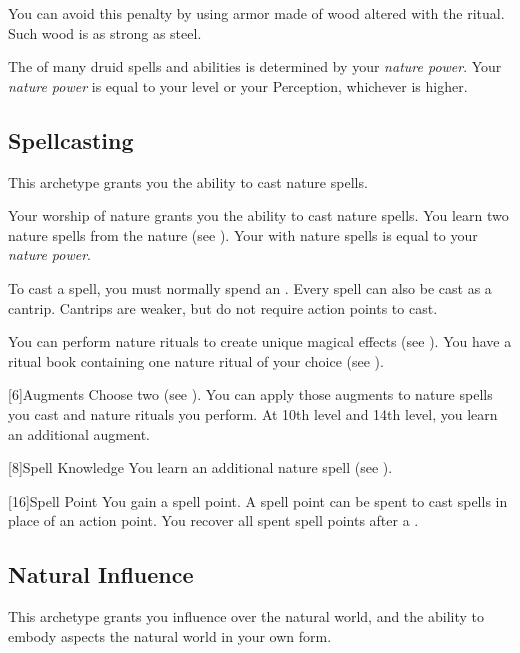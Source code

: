         You can avoid this penalty by using armor made of wood altered with the  ritual.
        Such wood is as strong as steel.

        The  of many druid spells and abilities is determined by your \textit{nature power}.
        Your \textit{nature power} is equal to your level or your Perception, whichever is higher.

    \subsection{Spellcasting}
        This archetype grants you the ability to cast nature spells.

        Your worship of nature grants you the ability to cast nature spells.
        You learn two nature spells from the nature  (see ).
        Your  with nature spells is equal to your \textit{nature power}.

        To cast a spell, you must normally spend an .
        Every spell can also be cast as a cantrip.
        Cantrips are weaker, but do not require action points to cast.

        You can perform nature rituals to create unique magical effects (see ).
        You have a ritual book containing one nature ritual of your choice (see ).

        [6]{Augments}
        Choose two  (see ).
        You can apply those augments to nature spells you cast and nature rituals you perform.
        At 10th level and 14th level, you learn an additional augment.

        [8]{Spell Knowledge}
        You learn an additional nature spell (see ).

        [16]{Spell Point} 
        You gain a spell point.
        A spell point can be spent to cast spells in place of an action point.
        You recover all spent spell points after a .

    \subsection{Natural Influence}
        This archetype grants you influence over the natural world, and the ability to embody aspects the natural world in your own form.

